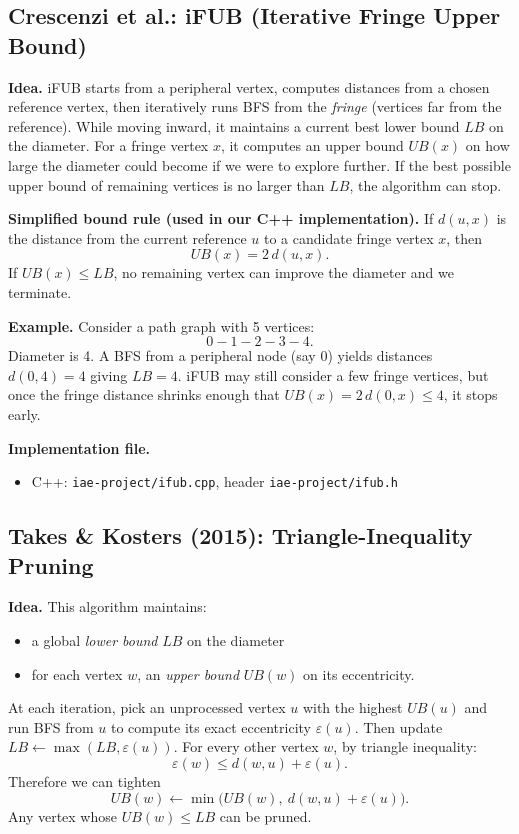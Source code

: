 \documentclass[11pt]{article}
\begin{document}
\subsection{Crescenzi et al.: iFUB (Iterative Fringe Upper Bound)}

\textbf{Idea.} iFUB starts from a peripheral vertex, computes distances from a chosen reference vertex, then iteratively runs BFS from the \emph{fringe} (vertices far from the reference). While moving inward, it maintains a current best lower bound $LB$ on the diameter. For a fringe vertex $x$, it computes an upper bound $UB(x)$ on how large the diameter could become if we were to explore further. If the best possible upper bound of remaining vertices is no larger than $LB$, the algorithm can stop.

\textbf{Simplified bound rule (used in our C++ implementation).}
If $d(u,x)$ is the distance from the current reference $u$ to a candidate fringe vertex $x$, then
\[
UB(x) = 2\, d(u,x).
\]
If $UB(x) \le LB$, no remaining vertex can improve the diameter and we terminate.

\textbf{Example.} Consider a path graph with 5 vertices:
\[
0-1-2-3-4.
\]
Diameter is 4. A BFS from a peripheral node (say 0) yields distances $d(0,4)=4$ giving $LB=4$. iFUB may still consider a few fringe vertices, but once the fringe distance shrinks enough that $UB(x)=2\,d(0,x)\le 4$, it stops early.

\textbf{Implementation file.}
\begin{itemize}
  \item C++: \texttt{iae-project/ifub.cpp}, header \texttt{iae-project/ifub.h}
\end{itemize}

\subsection{Takes \& Kosters (2015): Triangle-Inequality Pruning}

\textbf{Idea.} This algorithm maintains:
\begin{itemize}
  \item a global \emph{lower bound} $LB$ on the diameter
  \item for each vertex $w$, an \emph{upper bound} $UB(w)$ on its eccentricity.
\end{itemize}

At each iteration, pick an unprocessed vertex $u$ with the highest $UB(u)$ and run BFS from $u$ to compute its exact eccentricity $\varepsilon(u)$. Then update $LB\leftarrow \max(LB,\varepsilon(u))$. For every other vertex $w$, by triangle inequality:
\[
\varepsilon(w) \le d(w,u) + \varepsilon(u).
\]
Therefore we can tighten
\[
UB(w) \leftarrow \min\big(UB(w),\ d(w,u)+\varepsilon(u)\big).
\]
Any vertex whose $UB(w)\le LB$ can be pruned.
\end{document}
